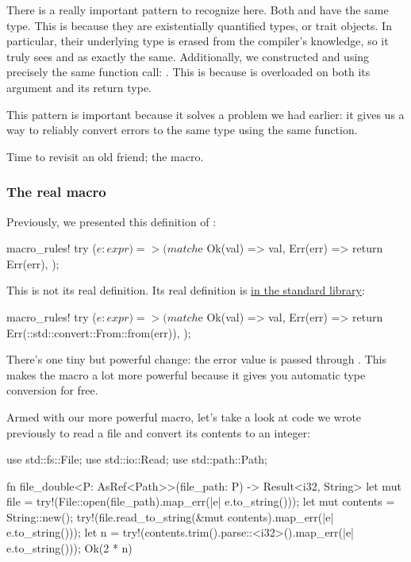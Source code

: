 There is a really important pattern to recognize here. Both  and  have the same type. This is because 
they are existentially quantified types, or trait objects. In particular, their underlying type is erased from the 
compiler's knowledge, so it truly sees  and  as exactly the same. Additionally, we constructed  
and  using precisely the same function call: . This is because  is overloaded 
on both its argument and its return type.

\blank

This pattern is important because it solves a problem we had earlier: it gives us a way to reliably convert errors to the 
same type using the same function.

\blank

Time to revisit an old friend; the  macro.

\subsubsection*{The real  macro}

Previously, we presented this definition of :

\begin{rustc}
macro_rules! try {
    ($e:expr) => (match $e {
        Ok(val) => val,
        Err(err) => return Err(err),
    });
}
\end{rustc}

This is not its real definition. Its real definition is \href{https://doc.rust-lang.org/std/macro.try!.html}{in the 
standard library}:

\begin{rustc}
macro_rules! try {
    ($e:expr) => (match $e {
        Ok(val) => val,
        Err(err) => return Err(::std::convert::From::from(err)),
    });
}
\end{rustc}

There's one tiny but powerful change: the error value is passed through . This makes the  macro 
a lot more powerful because it gives you automatic type conversion for free.

\blank

Armed with our more powerful  macro, let's take a look at code we wrote previously to read a file and convert 
its contents to an integer:

\begin{rustc}
use std::fs::File;
use std::io::Read;
use std::path::Path;

fn file_double<P: AsRef<Path>>(file_path: P) -> Result<i32, String> {
    let mut file = try!(File::open(file_path).map_err(|e| e.to_string()));
    let mut contents = String::new();
    try!(file.read_to_string(&mut contents).map_err(|e| e.to_string()));
    let n = try!(contents.trim().parse::<i32>().map_err(|e| e.to_string()));
    Ok(2 * n)
}
\end{rustc}

